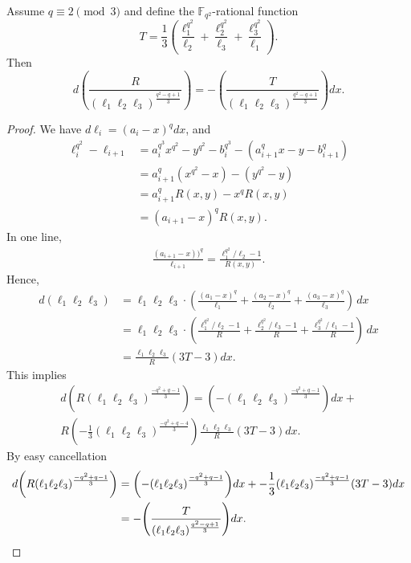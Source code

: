 \documentclass[entropy,article,submit,pdftex,moreauthors]{Definitions/mdpi}
\begin{document}
\begin{Lemma} \label{lm:dR-dT}
Assume $q\equiv 2 \pmod3$ and define the $\mathbb{F}_{q^2}$-rational function 
\[T=\frac{1}{3}\left(\frac{\ell_1^{q^2}}{\ell_2} + \frac{\ell_2^{q^2}}{\ell_3} + \frac{\ell_3^{q^2}}{\ell_1}\right).\]
Then
\[d\left(\frac{R}{(\ell_1\ell_{2}\ell_{3})^{\frac{q^2-q+1}{3}}}\right) = - \left(\frac{T}{(\ell_1\ell_{2}\ell_{3})^{\frac{q^2-q+1}{3}}}\right) dx.\]
\end{Lemma}
\begin{proof}
We have $d\ell_i=(a_i-x)^q dx$, and
\begin{align*}
\ell_i^{q^2}-\ell_{i+1} &= a_i^{q^3}x^{q^2}-y^{q^2}-b_i^{q^3}-(a_{i+1}^{q}x-y-b_{i+1}^{q}) \\
&= a_{i+1}^q(x^{q^2}-x)-(y^{q^2}-y) \\
&= a_{i+1}^q R(x,y) - x^q R(x,y) \\
&= (a_{i+1}-x)^q R(x,y).
\end{align*}
In one line,
\begin{align} \label{eq:ai-x-to-q}
\frac{(a_{i+1}-x))^q}{\ell_{i+1}} = \frac{\ell_1^{q^2}/\ell_2-1}{R(x,y)}.
\end{align}
Hence,
\begin{align*}
d(\ell_1\ell_{2}\ell_{3}) & = \ell_1\ell_{2}\ell_{3} \cdot \left( \frac{(a_1-x)^q}{\ell_1} + \frac{(a_2-x)^q}{\ell_2} + \frac{(a_3-x)^q}{\ell_3}\right)\, dx \\
&= \ell_1\ell_{2}\ell_{3} \cdot \left( \frac{\ell_1^{q^2}/\ell_2-1}{R} + \frac{\ell_2^{q^2}/\ell_3-1}{R} + \frac{\ell_3^{q^2}/\ell_1-1}{R}\right)\, dx \\
&= \frac{\ell_1\ell_{2}\ell_{3}}{R}(3T-3)dx.
\end{align*}
This implies
\begin{multline*}
d\left(R(\ell_1\ell_{2}\ell_{3})^{\frac{-q^2+q-1}{3}}\right) =\left( -(\ell_1\ell_{2}\ell_{3})^{\frac{-q^2+q-1}{3}}\right) dx + \\R \left(-\frac{1}{3}(\ell_1\ell_{2}\ell_{3})^{\frac{-q^2+q-4}{3}}\right) \frac{\ell_1\ell_{2}\ell_{3}}{R}(3T-3)dx.
\end{multline*}
By easy cancellation
\begin{align*}
d\left(R(\ell_1\ell_{2}\ell_{3})^{\frac{-q^2+q-1}{3}}\right) &=\left( -(\ell_1\ell_{2}\ell_{3})^{\frac{-q^2+q-1}{3}}\right) dx + -\frac{1}{3}(\ell_1\ell_{2}\ell_{3})^{\frac{-q^2+q-1}{3}} (3T-3)dx\\
&= - \left(\frac{T}{(\ell_1\ell_{2}\ell_{3})^{\frac{q^2-q+1}{3}}}\right) dx. \qedhere
\end{align*}
\end{proof}
\end{document}
